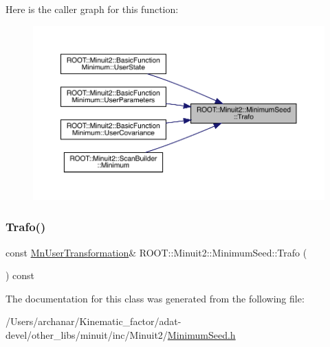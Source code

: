 Here is the caller graph for this function\+:
\nopagebreak
\begin{figure}[H]
\begin{center}
\leavevmode
\includegraphics[width=350pt]{d1/d50/classROOT_1_1Minuit2_1_1MinimumSeed_a140162d25593e6675f6f521fc9d5fc84_icgraph}
\end{center}
\end{figure}
\mbox{\label{classROOT_1_1Minuit2_1_1MinimumSeed_a140162d25593e6675f6f521fc9d5fc84}} 
\subsubsection{\texorpdfstring{Trafo()}{Trafo()}\hspace{0.1cm}{\footnotesize\ttfamily [3/3]}}
{\footnotesize\ttfamily const \mbox{\hyperlink{classROOT_1_1Minuit2_1_1MnUserTransformation}{Mn\+User\+Transformation}}\& R\+O\+O\+T\+::\+Minuit2\+::\+Minimum\+Seed\+::\+Trafo (\begin{DoxyParamCaption}{ }\end{DoxyParamCaption}) const\hspace{0.3cm}{\ttfamily [inline]}}



The documentation for this class was generated from the following file\+:\begin{DoxyCompactItemize}
\item 
/\+Users/archanar/\+Kinematic\+\_\+factor/adat-\/devel/other\+\_\+libs/minuit/inc/\+Minuit2/\mbox{\hyperlink{adat-devel_2other__libs_2minuit_2inc_2Minuit2_2MinimumSeed_8h}{Minimum\+Seed.\+h}}\end{DoxyCompactItemize}
